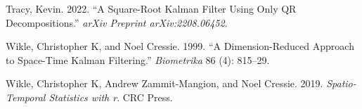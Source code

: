 \documentclass[
]{report}
\newlength{\cslhangindent}
\newenvironment{CSLReferences}[2] %
 {\begin{list}{}{%
  \setlength{\itemindent}{0pt}
  \setlength{\leftmargin}{0pt}
  \setlength{\parsep}{0pt}
  \ifodd #1
   \setlength{\leftmargin}{\cslhangindent}
   \setlength{\itemindent}{-1\cslhangindent}
  \fi
  \setlength{\itemsep}{#2\baselineskip}}}
 {\end{list}}
\theoremstyle{plain}
\theoremstyle{plain}
\theoremstyle{remark}
\begin{document}
\begin{CSLReferences}{1}{0}
Tracy, Kevin. 2022. {``A Square-Root Kalman Filter Using Only QR
Decompositions.''} \emph{arXiv Preprint arXiv:2208.06452}.

Wikle, Christopher K, and Noel Cressie. 1999. {``A Dimension-Reduced
Approach to Space-Time Kalman Filtering.''} \emph{Biometrika} 86 (4):
815--29.

Wikle, Christopher K, Andrew Zammit-Mangion, and Noel Cressie. 2019.
\emph{Spatio-Temporal Statistics with r}. CRC Press.

\end{CSLReferences}
\end{document}
